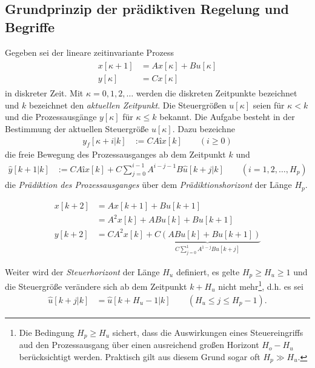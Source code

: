 \subsection{Grundprinzip der prädiktiven Regelung und Begriffe}
\label{subsec:grundprinzip_mpr}
Gegeben sei der lineare zeitinvariante Prozess
\begin{align}
	\begin{split}\label{eqn:kap_4_zustandsraummodell}
	x[\kappa+1] & = A x[\kappa] + B u[\kappa] \\
	y[\kappa] & = Cx[\kappa]
	\end{split}
\end{align}
in diskreter Zeit. Mit $\kappa=0,1,2,\ldots$ werden die diskreten Zeitpunkte bezeichnet und $k$ bezeichnet den \textit{aktuellen Zeitpunkt}. Die Steuergrößen $u[\kappa]$ seien für
$\kappa < k$ und die Prozessausgänge $y[\kappa]$ für $\kappa \le k$ bekannt. Die Aufgabe besteht in der Bestimmung der aktuellen Steuergröße $u[\kappa]$. Dazu bezeichne
\begin{align}
	y_f[\kappa +i|k] & := CAîx[k]\qquad (i\ge 0)
\end{align}
die freie Bewegung des Prozessausganges ab dem Zeitpunkt $k$ und 
\begin{align}
	\hat{y}[k+1|k] & := CAîx[k]+C\sum\limits_{j=0}^{i-1}A^{i-j-1}B\hat{u}[k+j|k]\qquad (i=1,2,\ldots,H_p) \label{eqn:kap_4_praediktion}
\end{align}
die \textit{Prädiktion des Prozessausganges} über dem \textit{Prädiktionshorizont} der Länge $H_p$.
\begin{exmp}[Prädiktionshorizont $H_p=2$]
\begin{align*}
	x[k+2] & = Ax[k+1]+Bu[k+1]\\
	& = A^2x[k]+ABu[k]+Bu[k+1]\\
	y[k+2] & = CA^2x[k]+\underbrace{C\left( ABu[k]+Bu[k+1] \right)}_{C\sum\limits_{j=0}^1A^{1-j}Bu[k+j]}
\end{align*}
\end{exmp}
Weiter wird der \textit{Steuerhorizont} der Länge $H_u$ definiert, es gelte $H_p\ge H_u \ge 1$ und die Steuergröße verändere sich ab dem Zeitpunkt $k+H_u$ nicht mehr\footnote{Die
Bedingung $H_p\ge H_u$ sichert, dass die Auswirkungen eines Steuereingriffs aud den Prozessausgang über einen ausreichend großen Horizont $H_o-H_u$ berücksichtigt werden. Praktisch
gilt aus diesem Grund sogar oft $H_p \gg H_u$.}, d.h. es sei
\begin{align}
	\hat{u}[k+j|k] & = \hat{u}[k+H_u-1|k]\qquad (H_u\le j\le H_p-1).\label{eqn:kap_4_steuerhorizont}
\end{align}
